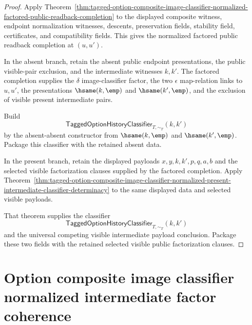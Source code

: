 \begin{proof}
Apply
Theorem~\ref{thm:tagged-option-composite-image-classifier-normalized-factored-public-readback-completion}
to the displayed composite witness, endpoint normalization witnesses, descents,
preservation fields, stability field, certificates, and compatibility fields.
This gives the normalized factored public readback completion at $(u,u')$.

In the absent branch, retain the absent public endpoint presentations, the
public visible-pair exclusion, and the intermediate witnesses $k,k'$. The
factored completion supplies the $\delta$ image-classifier factor, the two
$\epsilon$ map-relation links to $u,u'$, the presentations
$\hsame(k,\emp)$ and $\hsame(k',\emp)$, and the exclusion of visible present
intermediate pairs.

Build
$$
\mathsf{TaggedOptionHistoryClassifier}_{T,\sim_T}(k,k')
$$
by the absent-absent constructor from $\hsame(k,\emp)$ and
$\hsame(k',\emp)$. Package this classifier with the retained absent data.

In the present branch, retain the displayed payloads
$x,y,k,k',p,q,a,b$ and the selected visible factorization clauses supplied by
the factored completion. Apply
Theorem~\ref{thm:tagged-option-composite-image-classifier-normalized-present-intermediate-classifier-determinacy}
to the same displayed data and selected visible payloads.

That theorem supplies the classifier
$$
\mathsf{TaggedOptionHistoryClassifier}_{T,\sim_T}(k,k')
$$
and the universal competing visible intermediate payload conclusion. Package
these two fields with the retained selected visible public factorization
clauses.
\end{proof}

\section{Option composite image classifier normalized intermediate factor coherence}
\label{sec:option-composite-image-classifier-normalized-intermediate-factor-coherence}


